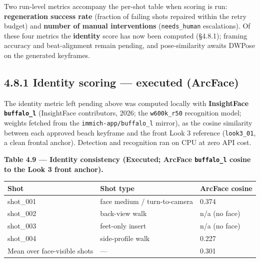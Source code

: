 \documentclass[10pt,twocolumn,letterpaper]{article}
\begin{document}
Two run-level metrics accompany the per-shot table when scoring is run: \textbf{regeneration success rate} (fraction of failing shots repaired within the retry budget) and \textbf{number of manual interventions} (\texttt{needs\_human} escalations). Of these four metrics the \textbf{identity} score has now been computed (\S{}4.8.1); framing accuracy and beat-alignment remain pending, and pose-similarity awaits DWPose on the generated keyframes.


\subsection*{4.8.1 Identity scoring --- executed (ArcFace)}

The identity metric left pending above was computed locally with \textbf{InsightFace \texttt{buffalo\_l}} (InsightFace contributors, 2026; the \texttt{w600k\_r50} recognition model; weights fetched from the \texttt{immich-app/buffalo\_l} mirror), as the cosine similarity between each approved beach keyframe and the front Look 3 reference (\texttt{look3\_01}, a clean frontal anchor). Detection and recognition ran on CPU at zero API cost.

\begin{table}[t]
\centering
{\footnotesize\textbf{\textbf{Table 4.9 --- Identity consistency (Executed; ArcFace \texttt{buffalo\_l} cosine to the Look 3 front anchor).}}}\par\vspace{3pt}
\footnotesize
\begin{tabularx}{\textwidth}{>{\RaggedRight\arraybackslash}X>{\RaggedRight\arraybackslash}Xl}
\toprule
Shot & Shot type & ArcFace cosine \\
\midrule
shot\_001 & face medium / turn-to-camera & 0.374 \\
shot\_002 & back-view walk & n/a (no face) \\
shot\_003 & feet-only insert & n/a (no face) \\
shot\_004 & side-profile walk & 0.227 \\
Mean over face-visible shots & --- & 0.301 \\
\bottomrule
\end{tabularx}
\end{table}
\end{document}
